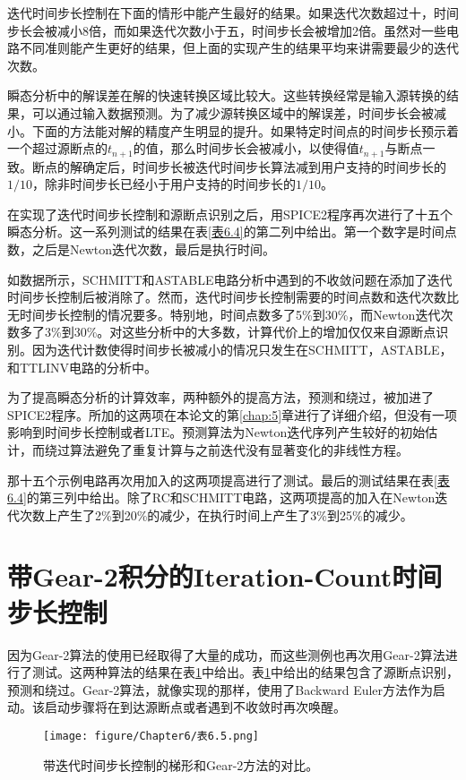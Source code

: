 迭代时间步长控制在下面的情形中能产生最好的结果。如果迭代次数超过十，时间步长会被减小8倍，而如果迭代次数小于五，时间步长会被增加2倍。虽然对一些电路不同准则能产生更好的结果，但上面的实现产生的结果平均来讲需要最少的迭代次数。

瞬态分析中的解误差在解的快速转换区域比较大。这些转换经常是输入源转换的结果，可以通过输入数据预测。为了减少源转换区域中的解误差，时间步长会被减小。下面的方法能对解的精度产生明显的提升。如果特定时间点的时间步长预示着一个超过源断点的$t_{n+1}$的值，那么时间步长会被减小，以使得值$t_{n+1}$与断点一致。断点的解确定后，时间步长被迭代时间步长算法减到用户支持的时间步长的$1/10$，除非时间步长已经小于用户支持的时间步长的$1/10$。

在实现了迭代时间步长控制和源断点识别之后，用SPICE2程序再次进行了十五个瞬态分析。这一系列测试的结果在表\ref{表6.4}的第二列中给出。第一个数字是时间点数，之后是Newton迭代次数，最后是执行时间。

如数据所示，SCHMITT和ASTABLE电路分析中遇到的不收敛问题在添加了迭代时间步长控制后被消除了。然而，迭代时间步长控制需要的时间点数和迭代次数比无时间步长控制的情况要多。特别地，时间点数多了5\%到30\%，而Newton迭代次数多了3\%到30\%。对这些分析中的大多数，计算代价上的增加仅仅来自源断点识别。因为迭代计数使得时间步长被减小的情况只发生在SCHMITT，ASTABLE，和TTLINV电路的分析中。

为了提高瞬态分析的计算效率，两种额外的提高方法，预测和绕过，被加进了SPICE2程序。所加的这两项在本论文的第\ref{chap:5}章进行了详细介绍，但没有一项影响到时间步长控制或者LTE。预测算法为Newton迭代序列产生较好的初始估计，而绕过算法避免了重复计算与之前迭代没有显著变化的非线性方程。

那十五个示例电路再次用加入的这两项提高进行了测试。最后的测试结果在表\ref{表6.4}的第三列中给出。除了RC和SCHMITT电路，这两项提高的加入在Newton迭代次数上产生了2\%到20\%的减少，在执行时间上产生了3\%到25\%的减少。

\section{带Gear-2积分的Iteration-Count时间步长控制}
因为Gear-2算法的使用已经取得了大量的成功，而这些测例也再次用Gear-2算法进行了测试。这两种算法的结果在表\ref{表6.5}中给出。表\ref{表6.5}中给出的结果包含了源断点识别，预测和绕过。Gear-2算法，就像实现的那样，使用了Backward Euler方法作为启动。该启动步骤将在到达源断点或者遇到不收敛时再次唤醒。
\begin{figure}[htbp]
\small
    \centering
    \texttt{[image: figure/Chapter6/表6.5.png]}
    \caption{带迭代时间步长控制的梯形和Gear-2方法的对比。}
    \label{表6.5}
\end{figure}

